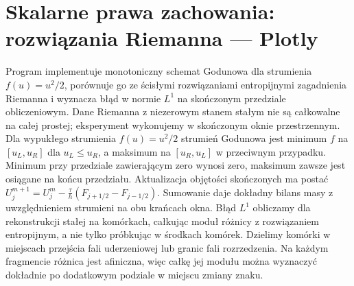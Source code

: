 \section{Skalarne prawa zachowania: rozwiązania Riemanna — Plotly}
\label{sec:pde24-code}
Program implementuje monotoniczny schemat Godunowa dla strumienia
$f(u)=u^2/2$, porównuje go ze ścisłymi rozwiązaniami
entropijnymi zagadnienia Riemanna i wyznacza błąd w normie
$L^1$ na skończonym przedziale obliczeniowym.
Dane Riemanna z niezerowym stanem stałym nie są
całkowalne na całej prostej; eksperyment wykonujemy
w skończonym oknie przestrzennym.
Dla wypukłego strumienia $f(u)=u^2/2$ strumień
Godunowa jest minimum $f$ na $[u_L,u_R]$ dla
$u_L\le u_R$, a maksimum na $[u_R,u_L]$ w przeciwnym
przypadku. Minimum przy przedziale zawierającym zero
wynosi zero, maksimum zawsze jest osiągane na końcu
przedziału. Aktualizacja objętości skończonych ma postać
$U_j^{m+1}=U_j^m-\frac{\tau}{h}
(F_{j+1/2}-F_{j-1/2})$.
Sumowanie daje dokładny bilans masy z uwzględnieniem
strumieni na obu krańcach okna.
Błąd $L^1$ obliczamy dla rekonstrukcji stałej
na komórkach, całkując moduł różnicy z rozwiązaniem
entropijnym, a nie tylko próbkując w środkach
komórek. Dzielimy komórki w miejscach przejścia
fali uderzeniowej lub granic fali rozrzedzenia.
Na każdym fragmencie różnica jest afiniczna,
więc całkę jej modułu można wyznaczyć dokładnie
po dodatkowym podziale w miejscu zmiany znaku.
